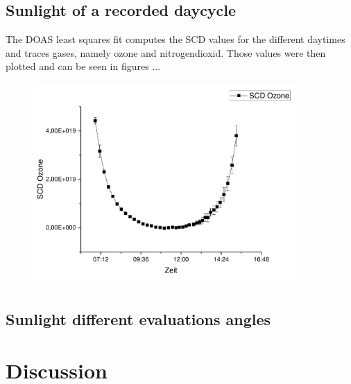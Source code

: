 \documentclass[12pt, english]{scrartcl} %
\begin{document}
\begin{multicols}{2}
\subsection{Sunlight of a recorded daycycle}
The DOAS least squares fit computes the SCD values for the different daytimes and traces gases, namely ozone and nitrogendioxid. Those values were then plotted and can be seen in figures ...
\begin{figure}
	\includegraphics[width= 0.9\textwidth]{graphics/o3scd.pdf}
\end{figure}
 
\subsection{Sunlight different evaluations angles}


\section{Discussion}
\end{multicols}
\end{document}
